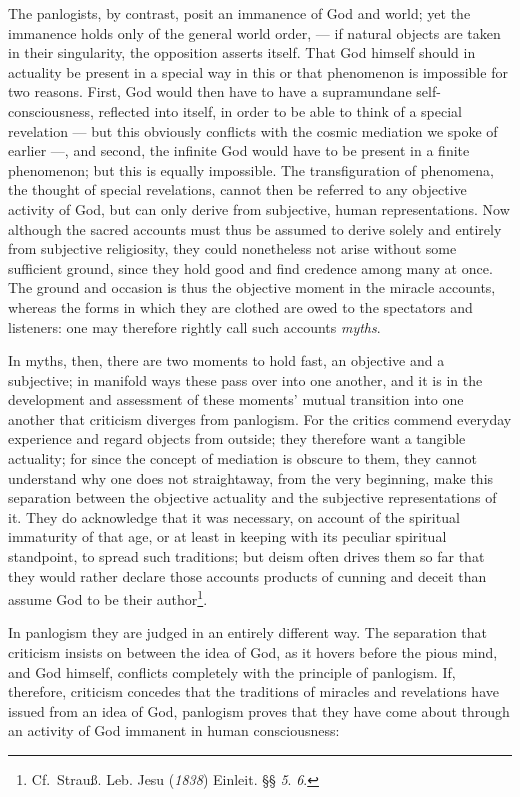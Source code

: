 \documentclass[12pt]{book}
\newcommand{\opage}[1]{\marginnote{\footnotesize\textit{[#1]}}}
\begin{document}
The panlogists, by contrast, posit an immanence of God and world; yet the
immanence holds only of the general world order, --- if natural objects are
taken in their singularity, the opposition asserts itself. That God himself
should in actuality be present in a special way in this or that phenomenon is
impossible for two reasons. First, God would then have to have a supramundane
self-consciousness, reflected into itself, in order to be able to think of a
special revelation --- but this obviously conflicts with the cosmic mediation
we spoke of earlier ---, and second, the infinite God would have to be present
in a finite phenomenon; but this is equally impossible. The transfiguration of
phenomena, the thought of special revelations, cannot then be referred to any
objective activity of God, but can only derive from subjective, human
representations. Now although the sacred accounts must thus be assumed to
derive solely and entirely from subjective religiosity, they could nonetheless
not arise without some sufficient ground, since they hold good and find credence
among many at once. The ground and occasion is thus
\opage{131} \setcounter{footnote}{0}%
the objective moment in the miracle accounts, whereas the forms in which they
are clothed are owed to the spectators and listeners: one may therefore rightly
call such accounts \emph{myths}.

In myths, then, there are two moments to hold fast, an objective and a
subjective; in manifold ways these pass over into one another, and it is in the
development and assessment of these moments' mutual transition into one another
that criticism diverges from panlogism. For the critics commend everyday
experience and regard objects from outside; they therefore want a tangible
actuality; for since the concept of mediation is obscure to them, they cannot
understand why one does not straightaway, from the very beginning, make this
separation between the objective actuality and the subjective representations
of it. They do acknowledge that it was necessary, on account of the spiritual
immaturity of that age, or at least in keeping with its peculiar spiritual
standpoint, to spread such traditions; but deism often drives them so far that
they would rather declare those accounts products of cunning and deceit than
assume God to be their author\footnote{Cf.\ Strauß. Leb.
Jesu (\textit{1838}) Einleit. §§ \textit{5}. \textit{6}.}.

In panlogism they are judged in an entirely different way. The separation that
criticism insists on between the idea of God, as it hovers before the pious
mind, and God himself, conflicts completely with the principle of panlogism.
If, therefore, criticism concedes that the traditions of miracles and
revelations have issued from an idea of God, panlogism proves that they have
come about through an activity of God immanent in human consciousness:
\end{document}
